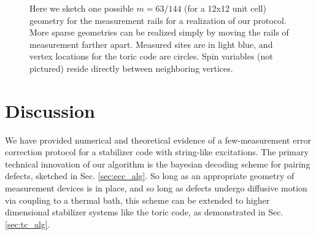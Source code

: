 \documentclass[twocolumn,superscriptaddress,aps,prb,floatfix]{revtex4-1}
\begin{document}
\begin{figure}
\begin{center}
\end{center}
\caption{Here we sketch one possible $m=63/144$ (for a 12x12 unit cell) geometry for the measurement rails for a realization of our protocol.  More sparse geometries can be realized simply by moving the rails of measurement farther apart.  Measured sites are in light blue, and vertex locations for the toric code are circles.  Spin variables (not pictured) reside directly between neighboring vertices.}
\label{fig:tc_fig}
\end{figure}




\section{Discussion}
\label{sec:discussion}

We have provided numerical and theoretical evidence of a few-measurement error correction protocol for a stabilizer code with string-like excitations.  The primary technical innovation of our algorithm is the bayesian decoding scheme for pairing defects, sketched in Sec. \ref{sec:ecc_alg}.  So long as an appropriate geometry of measurement devices is in place, and so long as defects undergo diffusive motion via coupling to a thermal bath, this scheme can be extended to higher dimensional stabilizer systems like the toric code, as demonstrated in Sec. \ref{sec:tc_alg}.
\end{document}
